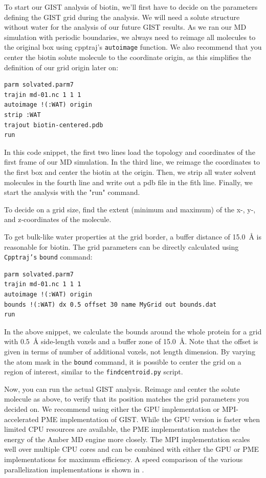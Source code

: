 \documentclass[9pt,tutorial]{livecoms}
\newcommand{\software}{\texttt}
\newcommand\inlinecode{\texttt}
\begin{document}
To start our GIST analysis of biotin, we'll first have to decide on the parameters defining the GIST grid during the analysis.
We will need a solute structure without water for the analysis of our future GIST results. 
As we ran our MD simulation with periodic boundaries, we always need to reimage all molecules to the original box using cpptraj's \inlinecode{autoimage} function. 
We also recommend that you center the biotin solute molecule to the coordinate origin, as this simplifies the definition of our grid origin later on:

\begin{lstlisting}[style=cpptraj]
parm solvated.parm7 
trajin md-01.nc 1 1 1 
autoimage !(:WAT) origin 
strip :WAT 
trajout biotin-centered.pdb 
run
\end{lstlisting}
In this code snippet, the first two lines load the topology and coordinates of the first frame of our MD simulation. 
In the third line, we reimage the coordinates to the first box and center the biotin at the origin. 
Then, we strip all water solvent molecules in the fourth line and write out a pdb file in the fith line. 
Finally, we start the analysis with the "run" command.

To decide on a grid size, find the extent (minimum and maximum) of the x-, \mbox{y-,} and z-coordinates of the molecule.

To get bulk-like water properties at the grid border, a buffer distance of \SI{15.0}{\angstrom} is reasonable for biotin.
The grid parameters can be directly calculated using \software{Cpptraj's} \inlinecode{bound} command:
\begin{lstlisting}[style=cpptraj]
parm solvated.parm7
trajin md-01.nc 1 1 1
autoimage !(:WAT) origin
bounds !(:WAT) dx 0.5 offset 30 name MyGrid out bounds.dat
run
\end{lstlisting}
In the above snippet, we calculate the bounds around the whole protein for a grid with \SI{0.5}{\angstrom} side-length voxels and a buffer zone of \SI{15.0}{\angstrom}. 
Note that the offset is given in terms of number of additional voxels, not length dimension. By varying the atom mask in the \inlinecode{bound} command, it is possible to center the grid on a region of interest, similar to the \software{findcentroid.py} script.

Now, you can run the actual GIST analysis.
Reimage and center the solute molecule as above, to verify that its position matches the grid parameters you decided on.
We recommend using either the GPU implementation or MPI-accelerated PME implementation of GIST.
While the GPU version is faster when limited CPU resources are available, the PME implementation matches the energy of the Amber MD engine more closely.
The MPI implementation \cite{Roe2023-mpi-gist} scales well over multiple CPU cores and can be combined with either the GPU or PME implementations for maximum efficiency. 
A speed comparison of the various parallelization implementations is shown in \cite{Roe2023-mpi-gist}.
\end{document}
